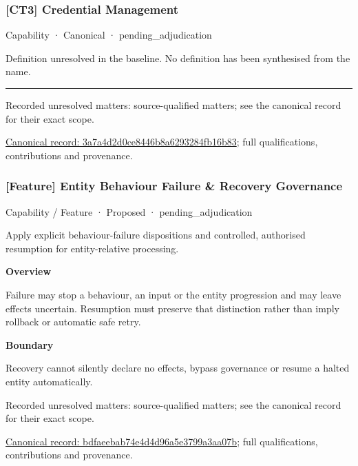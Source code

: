 \subsubsection{[CT3] Credential Management}

\label{element:3a7a4d2d0ce8446b8a6293284fb16b83}
{\small Capability · Canonical · pending\_adjudication}\par

Definition unresolved in the baseline. No definition has been synthesised from the name.



\medskip\hrule\medskip

{\small Recorded unresolved matters: source-qualified matters; see the canonical record for their exact scope.}\par
{\footnotesize \href{../../../../continuum/strategy/capability/3a7a4d2d0ce8446b8a6293284fb16b83.md}{Canonical record: 3a7a4d2d0ce8446b8a6293284fb16b83}; full qualifications, contributions and provenance.}\par
\subsubsection{[Feature] Entity Behaviour Failure \& Recovery Governance}

\label{element:bdfaeebab74e4d4d96a5e3799a3aa07b}
{\small Capability / Feature · Proposed · pending\_adjudication}\par

Apply explicit behaviour-failure dispositions and controlled, authorised resumption for entity-relative processing.



\textbf{Overview}



Failure may stop a behaviour, an input or the entity progression and may leave effects uncertain. Resumption must preserve that distinction rather than imply rollback or automatic safe retry.



\textbf{Boundary}



Recovery cannot silently declare no effects, bypass governance or resume a halted entity automatically.


{\small Recorded unresolved matters: source-qualified matters; see the canonical record for their exact scope.}\par
{\footnotesize \href{../../../../continuum/strategy/capability/feature/bdfaeebab74e4d4d96a5e3799a3aa07b.md}{Canonical record: bdfaeebab74e4d4d96a5e3799a3aa07b}; full qualifications, contributions and provenance.}\par
